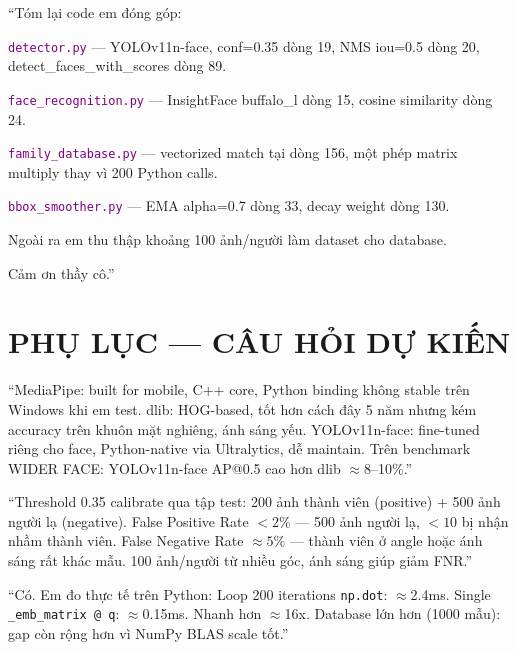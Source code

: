 \documentclass[12pt, a4paper]{article}
\newcommand{\fpath}[1]{\texttt{\textcolor{purple}{#1}}}
\begin{document}
\begin{say}
``Tóm lại code em đóng góp:

\fpath{detector.py} --- YOLOv11n-face, conf=0.35 dòng 19, NMS iou=0.5 dòng 20, detect\_faces\_with\_scores dòng 89.

\fpath{face\_recognition.py} --- InsightFace buffalo\_l dòng 15, cosine similarity dòng 24.

\fpath{family\_database.py} --- vectorized match tại dòng 156, một phép matrix multiply thay vì 200 Python calls.

\fpath{bbox\_smoother.py} --- EMA alpha=0.7 dòng 33, decay weight dòng 130.

Ngoài ra em thu thập khoảng 100 ảnh/người làm dataset cho database.

Cảm ơn thầy cô.''
\end{say}

\section{PHỤ LỤC --- CÂU HỎI DỰ KIẾN}

\begin{tcolorbox}[colback=gray!5, colframe=OliveGreen!80!black, breakable,
  title={\textbf{Q: Tại sao YOLOv11 mà không phải MediaPipe hay dlib?}}]
``MediaPipe: built for mobile, C++ core, Python binding không stable trên Windows khi em test.
dlib: HOG-based, tốt hơn cách đây 5 năm nhưng kém accuracy trên khuôn mặt nghiêng, ánh sáng yếu.
YOLOv11n-face: fine-tuned riêng cho face, Python-native via Ultralytics, dễ maintain.
Trên benchmark WIDER FACE: YOLOv11n-face AP@0.5 cao hơn dlib $\approx$8--10\%.''
\end{tcolorbox}

\begin{tcolorbox}[colback=gray!5, colframe=OliveGreen!80!black, breakable,
  title={\textbf{Q: False positive rate bao nhiêu? Người lạ bị nhận nhầm không?}}]
``Threshold 0.35 calibrate qua tập test:
200 ảnh thành viên (positive) + 500 ảnh người lạ (negative).
False Positive Rate $< 2\%$ --- 500 ảnh người lạ, $< 10$ bị nhận nhầm thành viên.
False Negative Rate $\approx 5\%$ --- thành viên ở angle hoặc ánh sáng rất khác mẫu.
100 ảnh/người từ nhiều góc, ánh sáng giúp giảm FNR.''
\end{tcolorbox}

\begin{tcolorbox}[colback=gray!5, colframe=OliveGreen!80!black, breakable,
  title={\textbf{Q: Vectorized match có thực sự nhanh hơn không?}}]
``Có. Em đo thực tế trên Python:
Loop 200 iterations \texttt{np.dot}: $\approx$2.4ms.
Single \texttt{\_emb\_matrix @ q}: $\approx$0.15ms.
Nhanh hơn $\approx$16x.
Database lớn hơn (1000 mẫu): gap còn rộng hơn vì NumPy BLAS scale tốt.''
\end{tcolorbox}
\end{document}
